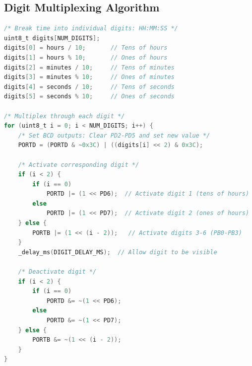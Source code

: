 \documentclass{article}
\begin{document}
\subsection{Digit Multiplexing Algorithm}
\begin{lstlisting}[language=C]
/* Break time into individual digits: HH:MM:SS */
uint8_t digits[NUM_DIGITS];
digits[0] = hours / 10;       // Tens of hours
digits[1] = hours % 10;       // Ones of hours
digits[2] = minutes / 10;     // Tens of minutes
digits[3] = minutes % 10;     // Ones of minutes
digits[4] = seconds / 10;     // Tens of seconds
digits[5] = seconds % 10;     // Ones of seconds

/* Multiplex through each digit */
for (uint8_t i = 0; i < NUM_DIGITS; i++) {
    /* Set BCD outputs: Clear PD2-PD5 and set new value */
    PORTD = (PORTD & ~0x3C) | ((digits[i] << 2) & 0x3C);
    
    /* Activate corresponding digit */
    if (i < 2) {
        if (i == 0)
            PORTD |= (1 << PD6);  // Activate digit 1 (tens of hours)
        else
            PORTD |= (1 << PD7);  // Activate digit 2 (ones of hours)
    } else {
        PORTB |= (1 << (i - 2));   // Activate digits 3-6 (PB0-PB3)
    }
    _delay_ms(DIGIT_DELAY_MS);  // Allow digit to be visible

    /* Deactivate digit */
    if (i < 2) {
        if (i == 0)
            PORTD &= ~(1 << PD6);
        else
            PORTD &= ~(1 << PD7);
    } else {
        PORTB &= ~(1 << (i - 2));
    }
}
\end{lstlisting}
\end{document}
